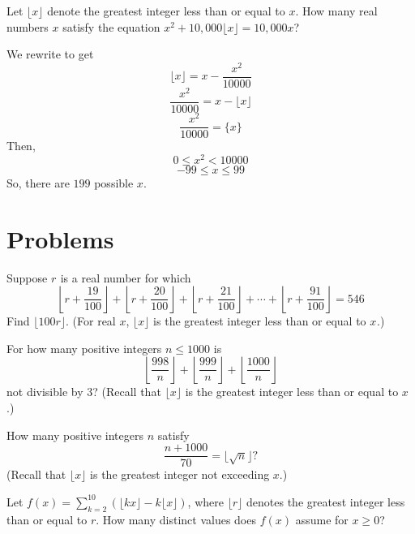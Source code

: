 \documentclass{article}
\begin{document}
\begin{exam}[AMC 10B 2018/25]
Let $\lfloor x \rfloor$ denote the greatest integer less than or equal to $x$. How many real numbers $x$ satisfy the equation $x^2 + 10,000\lfloor x \rfloor = 10,000x$?
\end{exam}

\begin{sol}
We rewrite to get
$$\lfloor x \rfloor = x-\frac{x^2}{10000}$$
$$\frac{x^2}{10000} = x-\lfloor x \rfloor$$
$$\frac{x^2}{10000} = \{ x \}$$
Then, $$0\leq x^2 < 10000$$
$$-99\leq x \leq 99$$
So, there are $\boxed{199}$ possible $x$.
\end{sol}

\newpage
\section{Problems}

\begin{prob}[1991 AIME/6]{4}
Suppose $r^{}_{}$ is a real number for which
$$
\left\lfloor r + \frac{19}{100} \right\rfloor + \left\lfloor r + \frac{20}{100} \right\rfloor + \left\lfloor r + \frac{21}{100} \right\rfloor + \cdots + \left\lfloor r + \frac{91}{100} \right\rfloor = 546$$
Find $\lfloor 100r \rfloor$. (For real $x$, $\lfloor x \rfloor$ is the greatest integer less than or equal to $x^{}_{}$.)
\end{prob}

\begin{prob}[AMC 10A 2020/22]{4}
For how many positive integers $n \le 1000$ is$$\left\lfloor \dfrac{998}{n} \right\rfloor+\left\lfloor \dfrac{999}{n} \right\rfloor+\left\lfloor \dfrac{1000}{n}\right \rfloor$$not divisible by $3$? (Recall that $\lfloor x \rfloor$ is the greatest integer less than or equal to $x$.)
\end{prob}


\begin{prob}[AMC 10B 2020/24]{6}
How many positive integers $n$ satisfy$$\dfrac{n+1000}{70} = \lfloor \sqrt{n} \rfloor?$$
(Recall that $\lfloor x\rfloor$ is the greatest integer not exceeding $x$.)
\end{prob}

\begin{prob}[AMC 10B 2016/25]{6}
Let $f(x)=\sum\limits_{k=2}^{10}(\lfloor kx \rfloor -k \lfloor x \rfloor)$, where $\lfloor r \rfloor$ denotes the greatest integer less than or equal to $r$. How many distinct values does $f(x)$ assume for $x \ge 0$?
\end{prob}
\end{document}
